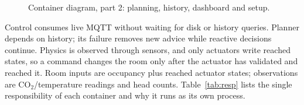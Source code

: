 \documentclass[11pt,a4paper]{article}
\begin{document}
\begin{figure}[H]
\par{}
\caption{Container diagram, part 2: planning, history, dashboard and setup.}\label{fig:containers-support}
\end{figure}
Control consumes live MQTT without waiting for disk or history queries. Planner depends on history; its failure removes new advice while reactive decisions continue. Physics is observed through sensors, and only actuators write reached states, so a command changes the room only after the actuator has validated and reached it.
Room inputs are occupancy plus reached actuator states; observations are CO$_2$/temperature readings and head counts. Table~\ref{tab:resp} lists the single responsibility of each container and why it runs as its own process.
\end{document}
